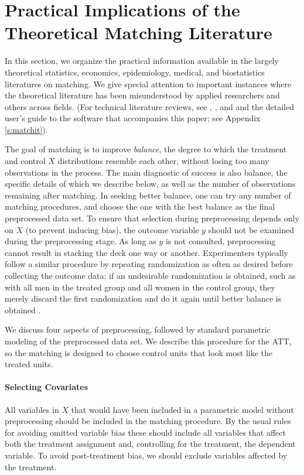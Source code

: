 \documentclass[11pt,titlepage]{article}
\begin{document}
\section{Practical Implications of the Theoretical Matching
  Literature}
\label{s:choose}

In this section, we organize the practical information available in
the largely theoretical statistics, economics, epidemiology, medical,
and biostatistics literatures on matching.  We give special attention
to important instances where the theoretical literature has been
misunderstood by applied researchers and others across fields.  (For
technical literature reviews, see \citet{Imbens04},
\citet{Rosenbaum02}, and \citet{Stuart04} and the detailed user's
guide to the software that accompanies this paper; see Appendix
\ref{s:matchit}).

The goal of matching is to improve \emph{balance}, the degree to which
the treatment and control $X$ distributions resemble each other,
without losing too many observations in the process.  The main
diagnostic of success is also balance, the specific details of which
we describe below, as well as the number of observations remaining
after matching.  In seeking better balance, one can try any number of
matching procedures, and choose the one with the best balance as the
final preprocessed data set.  To ensure that selection during
preprocessing depends only on $X$ (to prevent inducing bias), the
outcome variable $y$ should not be examined during the preprocessing
stage.  As long as $y$ is not consulted, preprocessing cannot result
in stacking the deck one way or another.  Experimenters typically
follow a similar procedure by repeating randomization as often as
desired before collecting the outcome data; if an undesirable
randomization is obtained, such as with all men in the treated group
and all women in the control group, they merely discard the first
randomization and do it again until better balance is obtained
\citep[see][]{Rubin01}.

We discuss four aspects of preprocessing, followed by standard
parametric modeling of the preprocessed data set.  We describe this
procedure for the ATT, so the matching is designed to choose control
units that look most like the treated units.

\paragraph{Selecting Covariates}
All variables in $X$ that would have been included in a parametric
model without preprocessing should be included in the matching
procedure.  By the usual rules for avoiding omitted variable bias
these should include all variables that affect both the treatment
assignment and, controlling for the treatment, the dependent variable.
To avoid post-treatment bias, we should exclude variables affected by
the treatment.  
\end{document}
